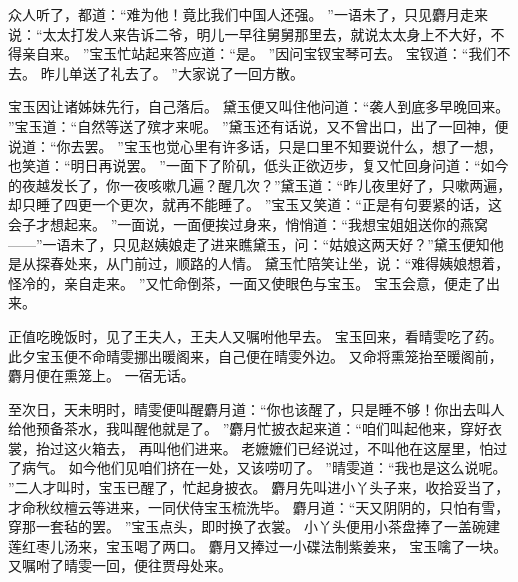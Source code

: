 \hop
众人听了，都道：“难为他！竟比我们中国人还强。
”一语未了，只见麝月走来说：“太太打发人来告诉二爷，明儿一早往舅舅那里去，就说太太身上不大好，不得亲自来。
”宝玉忙站起来答应道：“是。
”因问宝钗宝琴可去。
宝钗道：“我们不去。
昨儿单送了礼去了。
”大家说了一回方散。
\par
宝玉因让诸姊妹先行，自己落后。
黛玉便又叫住他问道：“袭人到底多早晚回来。
”宝玉道：“自然等送了殡才来呢。
”黛玉还有话说，又不曾出口，出了一回神，便说道：“你去罢。
”宝玉也觉心里有许多话，只是口里不知要说什么，想了一想，也笑道：“明日再说罢。
”一面下了阶矶，低头正欲迈步，复又忙回身问道：“如今的夜越发长了，你一夜咳嗽几遍？醒几次？”黛玉道：“昨儿夜里好了，只嗽两遍，却只睡了四更一个更次，就再不能睡了。
”宝玉又笑道：“正是有句要紧的话，这会子才想起来。
”一面说，一面便挨过身来，悄悄道：“我想宝姐姐送你的燕窝——”一语未了，只见赵姨娘走了进来瞧黛玉，问：“姑娘这两天好？”黛玉便知他是从探春处来，从门前过，顺路的人情。
黛玉忙陪笑让坐，说：“难得姨娘想着，怪冷的，亲自走来。
”又忙命倒茶，一面又使眼色与宝玉。
宝玉会意，便走了出来。
\par
正值吃晚饭时，见了王夫人，王夫人又嘱咐他早去。
宝玉回来，看晴雯吃了药。
此夕宝玉便不命晴雯挪出暖阁来，自己便在晴雯外边。
又命将熏笼抬至暖阁前，麝月便在熏笼上。
一宿无话。
\par
至次日，天未明时，晴雯便叫醒麝月道：“你也该醒了，只是睡不够！你出去叫人给他预备茶水，我叫醒他就是了。
”麝月忙披衣起来道：“咱们叫起他来，穿好衣裳，抬过这火箱去，
再叫他们进来。
老嬷嬷们已经说过，不叫他在这屋里，怕过了病气。
如今他们见咱们挤在一处，又该唠叨了。
”晴雯道：“我也是这么说呢。
”二人才叫时，宝玉已醒了，忙起身披衣。
麝月先叫进小丫头子来，收拾妥当了，才命秋纹檀云等进来，一同伏侍宝玉梳洗毕。
麝月道：“天又阴阴的，只怕有雪，穿那一套毡的罢。
”宝玉点头，即时换了衣裳。
小丫头便用小茶盘捧了一盖碗建莲红枣儿汤来，宝玉喝了两口。
麝月又捧过一小碟法制紫姜来，
宝玉噙了一块。
又嘱咐了晴雯一回，便往贾母处来。
\par
